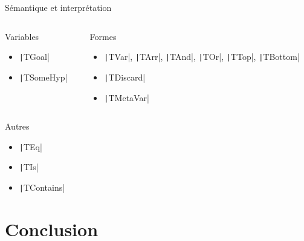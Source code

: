 \documentclass[french,usepdftitle=false,compress]{beamer}
\begin{document}
\begin{frame}{Sémantique et interprétation}
  \begin{columns}
    \begin{column}{0.5\textwidth}
      \begin{block}{Variables}
        \begin{itemize}
          \item \texttt|TGoal|
          \item \texttt|TSomeHyp|
        \end{itemize}
      \end{block}
    \end{column}

    \begin{column}{0.5\textwidth}
      \begin{block}{Formes}
        \begin{itemize}
          \item \texttt|TVar|, \texttt|TArr|, \texttt|TAnd|, \texttt|TOr|, \texttt|TTop|, \texttt|TBottom|
          \item \texttt|TDiscard|
          \item \texttt|TMetaVar|
        \end{itemize}
      \end{block}
    \end{column}
  \end{columns}

  \begin{block}{Autres}
    \begin{itemize}
      \item \texttt|TEq|
      \item \texttt|TIs|
      \item \texttt|TContains|
    \end{itemize}
  \end{block}
\end{frame}

\section{Conclusion}

\end{document}
